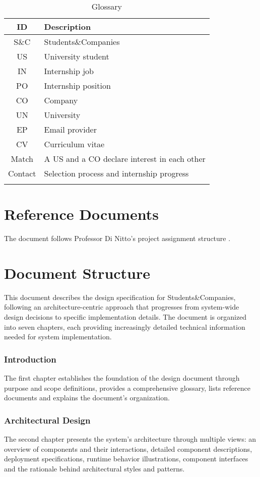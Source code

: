 \renewcommand{\arraystretch}{1.5}
\begin{longtable}{|c|p{8.5cm}|}
    \hline \rowcolor{polimiblue!40}
    \textbf{ID} & \textbf{Description} \\ \hline
    S\&C & Students\&Companies \\ \hline
    US & University student \\ \hline
    IN & Internship job \\ \hline
    PO & Internship position \\ \hline
    CO & Company \\ \hline
    UN & University \\ \hline
    EP & Email provider \\ \hline
    CV & Curriculum vitae \\ \hline
    Match & A US and a CO declare interest in each other \\ \hline
    Contact & Selection process and internship progress \\ \hline
\caption{Glossary}
\end{longtable}

\section{Reference Documents}
The document follows Professor Di Nitto's project assignment structure \cite{dinitto2024}.

\section{Document Structure}
This document describes the design specification for Students\&Companies, following an architecture-centric approach that progresses from system-wide design decisions to specific implementation details.
The document is organized into seven chapters, each providing increasingly detailed technical information needed for system implementation.

\subsubsection{Introduction}
The first chapter establishes the foundation of the design document through purpose and scope definitions, provides a comprehensive glossary, lists reference documents and explains the document's organization.

\subsubsection{Architectural Design}
The second chapter presents the system's architecture through multiple views: an overview of components and their interactions, detailed component descriptions, deployment specifications, runtime behavior illustrations, component interfaces and the rationale behind architectural styles and patterns.

